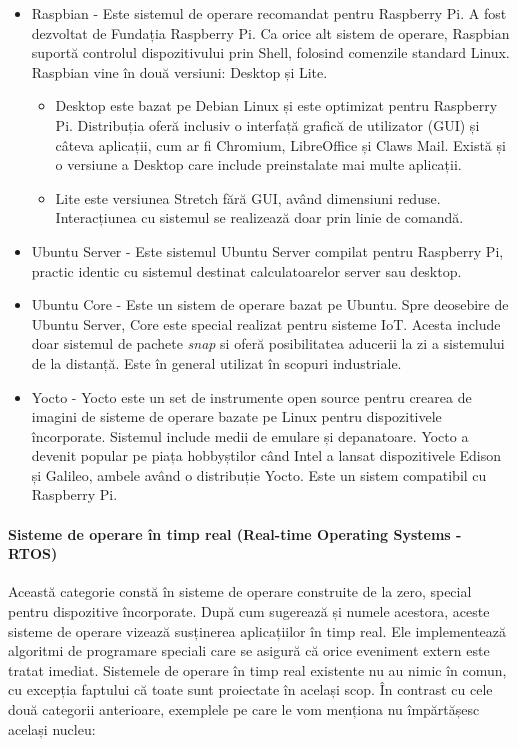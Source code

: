 \begin{itemize}
  \item Raspbian - Este sistemul de operare recomandat pentru Raspberry Pi.
    A fost dezvoltat de Fundația Raspberry Pi.
    Ca orice alt sistem de operare, Raspbian suportă controlul dispozitivului prin Shell, folosind comenzile standard Linux.
    Raspbian vine în două versiuni: Desktop și Lite.
  \begin{itemize}
    \item Desktop este bazat pe Debian Linux și este optimizat pentru Raspberry Pi.
      Distribuția oferă inclusiv o interfață grafică de utilizator (GUI) și câteva aplicații, cum ar fi Chromium, LibreOffice și Claws Mail.
      Există și o versiune a Desktop care include preinstalate mai multe aplicații.
    \item Lite este versiunea Stretch fără GUI, având dimensiuni reduse.
      Interacțiunea cu sistemul se realizează doar prin linie de comandă.
  \end{itemize}
  \item Ubuntu Server - Este sistemul Ubuntu Server compilat pentru Raspberry Pi, practic identic cu sistemul destinat calculatoarelor server sau desktop.
  \item Ubuntu Core - Este un sistem de operare bazat pe Ubuntu.
    Spre deosebire de Ubuntu Server, Core este special realizat pentru sisteme IoT.
    Acesta include doar sistemul de pachete \textit{snap} si oferă posibilitatea aducerii la zi a sistemului de la distanță.
    Este în general utilizat în scopuri industriale.
  \item Yocto - Yocto este un set de instrumente open source pentru crearea de imagini de sisteme de operare bazate pe Linux pentru dispozitivele încorporate.
    Sistemul include medii de emulare și depanatoare.
    Yocto a devenit popular pe piața hobbyștilor când Intel a lansat dispozitivele Edison și Galileo, ambele având o distribuție Yocto.
    Este un sistem compatibil cu Raspberry Pi.
\end{itemize}

\paragraph{Sisteme de operare în timp real (Real-time Operating Systems - RTOS)}

Această categorie constă în sisteme de operare construite de la zero, special pentru dispozitive încorporate.
După cum sugerează și numele acestora, aceste sisteme de operare vizează susținerea aplicațiilor în timp real.
Ele implementează algoritmi de programare speciali care se asigură că orice eveniment extern este tratat imediat.
Sistemele de operare în timp real existente nu au nimic în comun, cu excepția faptului că toate sunt proiectate în același scop.
În contrast cu cele două categorii anterioare, exemplele pe care le vom menționa nu împărtășesc același nucleu:

